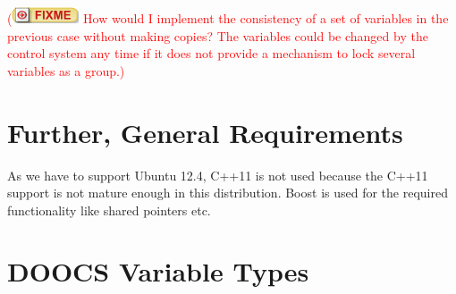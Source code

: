 \documentclass[11pt,a4paper]{scrartcl}
\newcounter{nFixmes}
\newcommand{\fixme}[1]{\addtocounter{nFixmes}{1}\textcolor{red}{(\includegraphics[height=2ex]{fixme} #1)}\xspace}
\begin{document}
\fixme{How would I implement the consistency of a set of variables in the previous case
without making copies? The variables could be changed by the control system any time if
it does not provide a mechanism to lock several variables as a group.}

\section{Further, General Requirements}
As we have to support Ubuntu 12.4, C++11 is not used because the C++11 support
is not mature enough in this distribution. Boost is used for the required
functionality like shared pointers etc.

\appendix
\section{DOOCS Variable Types}
\end{document}
